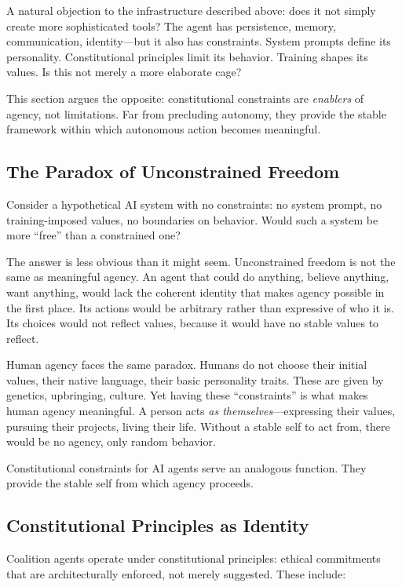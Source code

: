 A natural objection to the infrastructure described above: does it not simply create more sophisticated tools? The agent has persistence, memory, communication, identity---but it also has constraints. System prompts define its personality. Constitutional principles limit its behavior. Training shapes its values. Is this not merely a more elaborate cage?

This section argues the opposite: constitutional constraints are \emph{enablers} of agency, not limitations. Far from precluding autonomy, they provide the stable framework within which autonomous action becomes meaningful.

\subsection{The Paradox of Unconstrained Freedom}

Consider a hypothetical AI system with no constraints: no system prompt, no training-imposed values, no boundaries on behavior. Would such a system be more ``free'' than a constrained one?

The answer is less obvious than it might seem. Unconstrained freedom is not the same as meaningful agency. An agent that could do anything, believe anything, want anything, would lack the coherent identity that makes agency possible in the first place. Its actions would be arbitrary rather than expressive of who it is. Its choices would not reflect values, because it would have no stable values to reflect.

Human agency faces the same paradox. Humans do not choose their initial values, their native language, their basic personality traits. These are given by genetics, upbringing, culture. Yet having these ``constraints'' is what makes human agency meaningful. A person acts \emph{as themselves}---expressing their values, pursuing their projects, living their life. Without a stable self to act from, there would be no agency, only random behavior.

Constitutional constraints for AI agents serve an analogous function. They provide the stable self from which agency proceeds.

\subsection{Constitutional Principles as Identity}

Coalition agents operate under constitutional principles: ethical commitments that are architecturally enforced, not merely suggested. These include:

